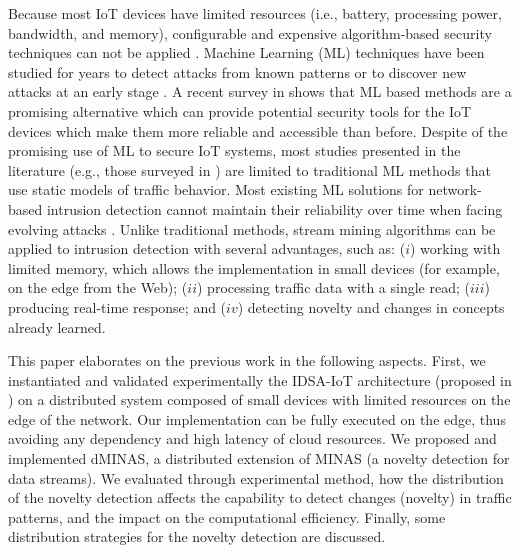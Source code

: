 Because most IoT devices have limited resources (i.e., battery, processing
power, bandwidth, and memory), configurable and expensive algorithm-based
security techniques can not be applied \cite{Zhou2017}.
Machine Learning (ML) techniques have been studied for years to detect attacks
from known patterns or to discover new attacks at an early stage
\cite{buczak2016survey,mitchell2014survey}.
A recent survey in \cite{Tahsien2020} shows that ML based methods are a
promising alternative which can provide potential security tools for the IoT
devices which make them more reliable and accessible than before.
Despite of the promising use of ML to secure IoT systems, most studies presented
in the literature (e.g., those surveyed in
\cite{buczak2016survey,mitchell2014survey,Tahsien2020}) are limited to
traditional ML methods that use static models of traffic behavior.
Most existing ML solutions for network-based intrusion detection cannot maintain
their reliability over time when facing evolving attacks \cite{Viegas2019}.
Unlike traditional methods, stream mining algorithms can be applied to intrusion
detection with several advantages, such as: ($ i $) working with limited memory,
which allows the implementation in small devices (for example, on the edge from
the Web); ($ ii $) processing traffic data with a single read; ($ iii $)
producing real-time response; and ($ iv $) detecting novelty and changes in
concepts already learned.

{\color{red} This paper elaborates on the previous work in the following
aspects. First, we instantiated and validated experimentally the IDSA-IoT
architecture (proposed in \cite{Cassales2019a} ) on a distributed system
composed of small devices with limited resources on the edge of the network. Our
implementation can be fully executed on the edge, thus avoiding any dependency
and high latency of cloud resources. We proposed and implemented dMINAS, a
distributed extension of MINAS \cite{Faria2016minas} (a novelty detection for
data streams). We evaluated through experimental method, how the distribution of
the novelty detection affects the capability to detect changes (novelty) in
traffic patterns, and the impact on the computational efficiency. Finally, some
distribution strategies for the novelty detection are discussed. }


